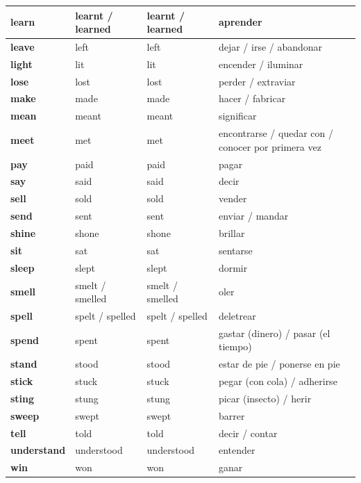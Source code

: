 \documentclass[11pt,a4paper]{article}
\begin{document}
\begin{longtable}{|>{\bfseries}p{2.8cm}|p{3.5cm}|p{3.7cm}|>{\raggedright\arraybackslash}p{6.6cm}|}
\rowcolor{verdeC} learn & learnt / learned & learnt / learned & aprender\\ \hline
\rowcolor{verdeC} leave & left & left & dejar / irse / abandonar\\ \hline
\rowcolor{verdeC} light & lit & lit & encender / iluminar\\ \hline
\rowcolor{verdeC} lose & lost & lost & perder / extraviar\\ \hline
\rowcolor{verdeC} make & made & made & hacer / fabricar\\ \hline
\rowcolor{verdeC} mean & meant & meant & significar\\ \hline
\rowcolor{verdeC} meet & met & met & encontrarse / quedar con / conocer por primera vez\\ \hline
\rowcolor{verdeC} pay & paid & paid & pagar\\ \hline
\rowcolor{verdeC} say & said & said & decir\\ \hline
\rowcolor{verdeC} sell & sold & sold & vender\\ \hline
\rowcolor{verdeC} send & sent & sent & enviar / mandar\\ \hline
\rowcolor{verdeC} shine & shone & shone & brillar\\ \hline
\rowcolor{verdeC} sit & sat & sat & sentarse\\ \hline
\rowcolor{verdeC} sleep & slept & slept & dormir\\ \hline
\rowcolor{verdeC} smell & smelt / smelled & smelt / smelled & oler\\ \hline
\rowcolor{verdeC} spell & spelt / spelled & spelt / spelled & deletrear\\ \hline
\rowcolor{verdeC} spend & spent & spent & gastar (dinero) / pasar (el tiempo)\\ \hline
\rowcolor{verdeC} stand & stood & stood & estar de pie / ponerse en pie\\ \hline
\rowcolor{verdeC} stick & stuck & stuck & pegar (con cola) / adherirse\\ \hline
\rowcolor{verdeC} sting & stung & stung & picar (insecto) / herir\\ \hline
\rowcolor{verdeC} sweep & swept & swept & barrer\\ \hline
\rowcolor{verdeC} tell & told & told & decir / contar\\ \hline
\rowcolor{verdeC} understand & understood & understood & entender\\ \hline
\rowcolor{verdeC} win & won & won & ganar\\ \hline
\end{longtable}
\end{document}
